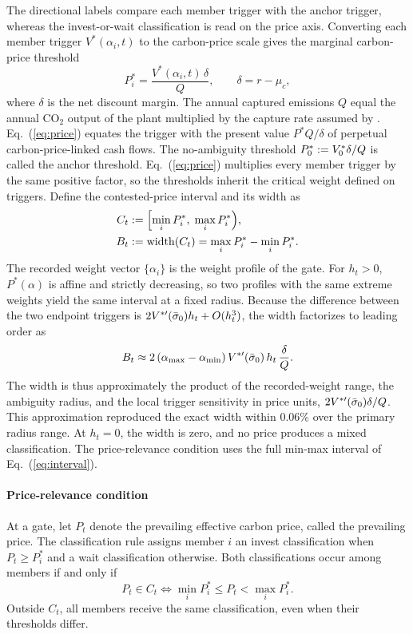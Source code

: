 The directional labels compare each member trigger with the anchor trigger, whereas the invest-or-wait classification is read on the price axis. Converting each member trigger $V^{*}(\alpha_i,t)$ to the carbon-price scale gives the marginal carbon-price threshold
\begin{equation}
P^{*}_{i}=\frac{V^{*}(\alpha_i,t)\,\delta}{Q},\qquad \delta=r-\mu_c,
\label{eq:price}
\end{equation}
where $\delta$ is the net discount margin. The annual captured emissions $Q$ equal the annual CO$_2$ output of the plant multiplied by the capture rate assumed by \citet{Sun2024}. Eq.~(\ref{eq:price}) equates the trigger with the present value $P^{*}Q/\delta$ of perpetual carbon-price-linked cash flows. The no-ambiguity threshold $P^{*}_{0}:=V^{*}_{0}\delta/Q$ is called the anchor threshold. Eq.~(\ref{eq:price}) multiplies every member trigger by the same positive factor, so the thresholds inherit the critical weight defined on triggers. Define the contested-price interval and its width as
\begin{equation}
\begin{aligned}
C_t&:=\Bigl[\min_i P^{*}_{i},\;\max_i P^{*}_{i}\Bigr),\\
B_t&:=\mathrm{width}(C_t)=\max_i P^{*}_{i}-\min_i P^{*}_{i}.
\end{aligned}
\label{eq:interval}
\end{equation}
The recorded weight vector $\{\alpha_i\}$ is the weight profile of the gate. For $h_t>0$, $P^{*}(\alpha)$ is affine and strictly decreasing, so two profiles with the same extreme weights yield the same interval at a fixed radius. Because the difference between the two endpoint triggers is $2V^{*\prime}(\bar{\sigma}_0)h_t+O(h_t^{3})$, the width factorizes to leading order as
\begin{equation}
B_t\approx 2\,(\alpha_{\max}-\alpha_{\min})\,V^{*\prime}(\bar{\sigma}_0)\,h_t\,\frac{\delta}{Q}.
\label{eq:width}
\end{equation}
The width is thus approximately the product of the recorded-weight range, the ambiguity radius, and the local trigger sensitivity in price units, $2V^{*\prime}(\bar{\sigma}_0)\delta/Q$. This approximation reproduced the exact width within 0.06\% over the primary radius range. At $h_t=0$, the width is zero, and no price produces a mixed classification. The price-relevance condition uses the full min-max interval of Eq.~(\ref{eq:interval}).

\paragraph{Price-relevance condition} At a gate, let $P_t$ denote the prevailing effective carbon price, called the prevailing price. The classification rule assigns member $i$ an invest classification when $P_t\ge P^{*}_{i}$ and a wait classification otherwise. Both classifications occur among members if and only if
\begin{equation}
P_t\in C_t\iff \min_i P^{*}_{i}\le P_t<\max_i P^{*}_{i}.
\label{eq:relevance}
\end{equation}
Outside $C_t$, all members receive the same classification, even when their thresholds differ.

